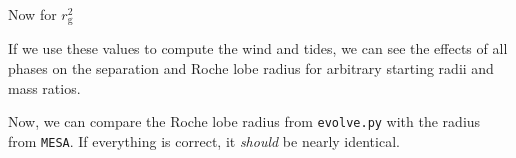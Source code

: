 \documentclass[a4paper,10pt]{article}
\begin{document}
Now for \(r_\text{g}^{2}\)

\begin{figure}[ht]
    \centering
\end{figure}

If we use these values to compute the wind and tides, we can see the effects of all phases on the separation and Roche lobe radius for arbitrary starting radii and mass ratios.

\begin{figure}[ht]
    \centering
\end{figure}
\nextpage
Now, we can compare the Roche lobe radius from \lstinline[style=output, breaklines=true]|evolve.py| with the radius from \lstinline[style=output, breaklines=true]|MESA|. If everything is correct, it \emph{should} be nearly identical.

\begin{figure}[ht]
    \centering
\end{figure}
\end{document}

